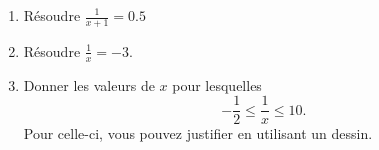 
\begin{exercice}\label{exosmath-0258}

    \begin{enumerate}
        \item
            Résoudre \( \frac{1}{ x+1 }=0.5\)
        \item
            Résoudre \( \frac{1}{ x }=-3\).
        \item
            Donner les valeurs de \( x\) pour lesquelles
            \begin{equation}
                -\frac{ 1 }{2}\leq \frac{1}{ x }\leq 10.
            \end{equation}
            Pour celle-ci, vous pouvez justifier en utilisant un dessin.
    \end{enumerate}

\end{exercice}
